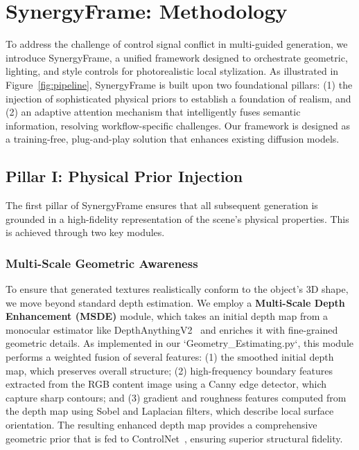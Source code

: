 \documentclass[letterpaper]{article} %
\begin{document}
\section{SynergyFrame: Methodology}
\label{sec:methodology}

To address the challenge of control signal conflict in multi-guided generation, we introduce SynergyFrame, a unified framework designed to orchestrate geometric, lighting, and style controls for photorealistic local stylization. As illustrated in Figure~\ref{fig:pipeline}, SynergyFrame is built upon two foundational pillars: (1) the injection of sophisticated physical priors to establish a foundation of realism, and (2) an adaptive attention mechanism that intelligently fuses semantic information, resolving workflow-specific challenges. Our framework is designed as a training-free, plug-and-play solution that enhances existing diffusion models.

\subsection{Pillar I: Physical Prior Injection}
\label{sec:priors}

The first pillar of SynergyFrame ensures that all subsequent generation is grounded in a high-fidelity representation of the scene's physical properties. This is achieved through two key modules.

\subsubsection{Multi-Scale Geometric Awareness}
To ensure that generated textures realistically conform to the object's 3D shape, we move beyond standard depth estimation. We employ a \textbf{Multi-Scale Depth Enhancement (MSDE)} module, which takes an initial depth map from a monocular estimator like DepthAnythingV2~\cite{depthanythingv2} and enriches it with fine-grained geometric details. As implemented in our `Geometry_Estimating.py`, this module performs a weighted fusion of several features: (1) the smoothed initial depth map, which preserves overall structure; (2) high-frequency boundary features extracted from the RGB content image using a Canny edge detector, which capture sharp contours; and (3) gradient and roughness features computed from the depth map using Sobel and Laplacian filters, which describe local surface orientation. The resulting enhanced depth map provides a comprehensive geometric prior that is fed to ControlNet~\cite{controlnet}, ensuring superior structural fidelity.
\end{document}
